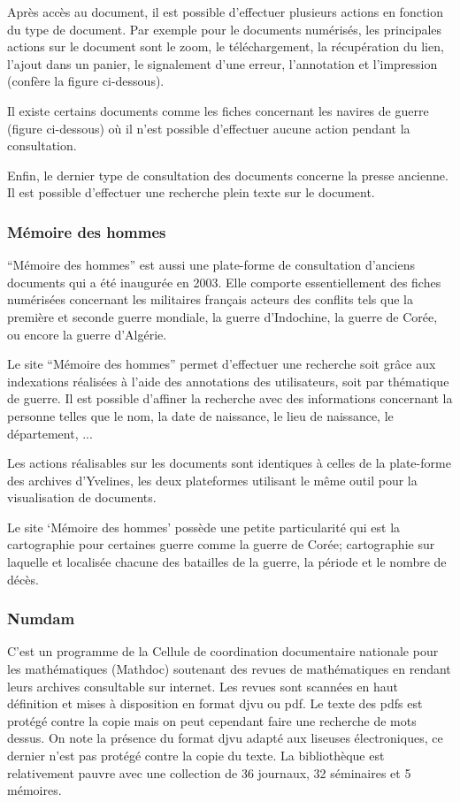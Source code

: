         Après accès au document, il est possible d’effectuer plusieurs actions  en fonction du type de document. Par exemple pour le documents numérisés,
        les principales actions sur le document sont le zoom, le téléchargement, la récupération du lien, l’ajout dans un panier, le signalement d’une erreur,
        l’annotation et l’impression (confère la figure ci-dessous).

        Il existe certains documents comme les fiches concernant les navires de guerre (figure ci-dessous) où il n’est possible d’effectuer aucune action pendant la consultation.

       Enfin, le dernier type de consultation des documents concerne la presse ancienne. Il est possible d’effectuer une recherche plein texte sur le document.

        \subsubsection{Mémoire des hommes}
        \label{subsubsec:memoire}
        “Mémoire des hommes” est aussi une plate-forme de consultation d’anciens documents  qui a été inaugurée en 2003. Elle comporte essentiellement
        des fiches numérisées concernant les militaires français acteurs des conflits tels que la première et seconde guerre mondiale, la guerre d’Indochine,
        la guerre de Corée, ou encore la guerre d’Algérie.

        Le site “Mémoire des hommes” permet d’effectuer une recherche soit grâce aux indexations réalisées à l’aide des annotations des utilisateurs,
        soit par thématique de guerre. Il est possible d’affiner la recherche avec des informations concernant la personne telles que le nom,
        la date de naissance, le lieu de naissance, le département, ...

        Les actions réalisables sur les documents sont identiques à celles de la plate-forme des archives d’Yvelines, les deux plateformes utilisant
        le même outil pour la visualisation de documents.

        Le site ‘Mémoire des hommes’ possède une petite particularité qui est la cartographie pour certaines guerre comme la guerre de Corée;
        cartographie sur laquelle et localisée chacune des batailles de la guerre, la période et le nombre de décès.

        \subsubsection{Numdam}
        \label{subsubsec:numdam}
        C’est un programme de la Cellule de coordination documentaire nationale pour les mathématiques (Mathdoc) soutenant des revues de
        mathématiques en rendant leurs archives consultable sur internet. Les revues sont scannées en haut définition et mises à disposition
        en format djvu ou pdf. Le texte des pdfs est protégé contre la copie mais on peut cependant faire une recherche de mots dessus.
        On note la présence du format djvu adapté aux liseuses électroniques, ce dernier n’est pas protégé contre la copie du texte.
        La bibliothèque est relativement pauvre avec une collection de 36 journaux, 32 séminaires et 5 mémoires.


